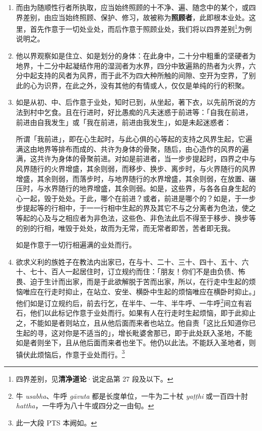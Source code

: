 \begin{enumerate}
\item 而由为随顺性行者所执取，应当始终照顾的十不净、遍、随念中的某个，或四界差别，由应当始终照顾、保护、修习，故被称为\textbf{照顾者}，此即根本业处。这里，首先作意于一切处业处，而后作意于照顾业处，我们将以四界差别\footnote{四界差别，见\textbf{清净道论}·说定品第 27 段及以下。}为例说明之。
\item 他以界观察如是住立、如是划分的身体：在此身中，二十分中粗重的坚硬者为地界，十二分中起凝结作用的湿润者为水界，四分中致遍熟的热者为火界，六分中起支持的风者为风界，而于此不为四大种所触的间隙、空开为空界，了别此的心为识界，在此之外，没有其他的有情或人，仅仅是单纯的行的积聚。
\item 如是从初、中、后作意于业处，知时已到，从坐起，著下衣，以先前所说的方法到村中乞食。且在行进时，好比愚痴的凡夫迷惑于前进等：「自我在前进，前进由自我发生」或「我在前进，前进由我发生」，如是未起迷惑者：\begin{quoting}所谓「我前进」，即在心生起时，与此心俱的心等起的支持之风界生起，它遍满这由地界等排布而成的、共许为身体的骨聚，随后，由心造作的风界的遍满，这共许为身体的骨聚前进。对如是前进者，当一步步提起时，四界之中与风界随行的火界增盛，其余则弱，而移步、换步、离步时，与火界随行的风界增盛，其余则弱，而落步时，与地界随行的水界增盛，其余则弱，在放置、碾压时，与水界随行的地界增盛，其余则弱。如是，这些界，与各各自身生起的心一起，毁于处处。于此，哪个在前进？或者，前进是哪个的？如是，于一步步提起等的行相中，于一一行相中生起的界及其它不与之分离者为色法，使之等起的心及与之相应者为非色法，这些色、非色法此后不得至于移步、换步等的别的行相，唯毁于处处，故而为无常，而无常者即苦，苦者即无我。\end{quoting}如是作意于一切行相遍满的业处而行。
\item 欲求义利的族姓子在教法内出家已，在与十、二十、三十、四十、五十、六十、七十、百人一起居住时，订立规约而住：「朋友！你们不是由负债、怖畏、迫于生计而出家，而是于此欲解脱于苦而出家，所以，在行走中生起的烦恼唯应在行走时抑止，在站立、安坐、横卧中生起的烦恼唯应在横卧时抑止。」他们如是订立规约后，前去行乞，在半牛、一牛、半牛呼、一牛呼\footnote{牛 \textit{usabha}、牛呼 \textit{gāvuta} 都是长度单位，一牛为二十杖 \textit{yaṭṭhi} 或一百四十肘 \textit{hattha}，一牛呼为八十牛或四分之一由旬。}间立有岩石，他们以此标记作意于业处而行。如果有人在行走时生起烦恼，即于此抑止之，不能如是者则站立，且从他后面而来者也站立。他自责「这比丘知道你已生起的寻，这对你是不适当的」，增长毗婆舍那已，即于此处跃入圣地，不能如是者则坐下，且从他后面而来者也坐下。他仍以此法。不能跃入圣地者，则镇伏此烦恼后，作意于业处而行。\footnote{此一大段 PTS 本阙如。}

\end{enumerate}
